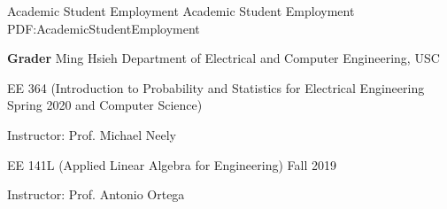 \documentclass[letterpaper,MMMyyyy,nonstopmode]{simpleresumecv}
\begin{document}
\begin{Body}
\newpage

\Section
{Academic Student Employment}
{Academic Student Employment}
{PDF:AcademicStudentEmployment}

\Entry
{\textbf{Grader}}
\newline
Ming Hsieh Department of Electrical and Computer Engineering, USC

\Gap
\BulletItem
EE 364 (Introduction to Probability and Statistics for Electrical Engineering
\hfill
Spring 2020
\newline
and Computer Science)

\SubBulletItem
Instructor:
Prof. Michael Neely

\Gap
\BulletItem
EE 141L (Applied Linear Algebra for Engineering)
\hfill
Fall 2019

\SubBulletItem
Instructor:
Prof. Antonio Ortega









\end{Body}
\end{document}
